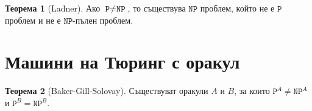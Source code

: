 \documentclass[a4paper]{article}
\theoremstyle{definition}
\newtheorem{theorem}{Теорема}
\begin{document}
\begin{theorem}[Ladner]
  Ако $\texttt{P} \neq \texttt{NP}$, то съществува $\texttt{NP}$ проблем, който не е $\texttt{P}$ проблем и не е $\texttt{NP}$-пълен проблем.
\end{theorem}

\section{Машини на Тюринг с оракул}

\begin{theorem}[Baker-Gill-Solovay]
  Съществуват оракули $A$ и $B$, за които $\texttt{P}^A \neq \texttt{NP}^A$ и $\texttt{P}^B = \texttt{NP}^B$.
\end{theorem}
\end{document}

